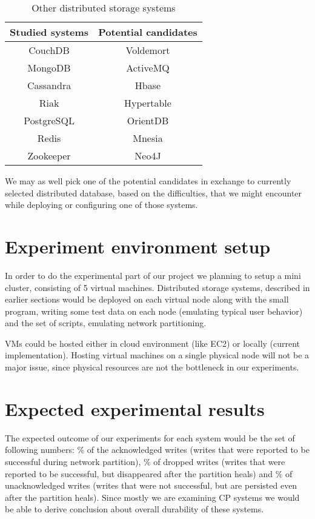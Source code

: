\documentclass[a4paper]{article}
\begin{document}
\begin{table}
	\centering
	\begin{tabular}{|c|c|}
		\hline
		\rowcolor{light-gray} \textbf{Studied systems} & \textbf{Potential candidates} \\ \hline
		CouchDB & Voldemort  \\ \hline
		MongoDB & ActiveMQ  \\ \hline
		Cassandra & Hbase  \\ \hline
		Riak & Hypertable  \\ \hline
		PostgreSQL & OrientDB  \\ \hline
		Redis & Mnesia  \\ \hline
		Zookeeper & Neo4J  \\ \hline
	\end{tabular}
	\caption{Other distributed storage systems}
	\label{tab:cacndidates}
\end{table}

We may as well pick one of the potential candidates in exchange to currently selected distributed database, based on the difficulties, that we might encounter while deploying or configuring one of those systems.

\section{Experiment environment setup}

In order to do the experimental part of our project we planning to setup a mini cluster, consisting of 5 virtual machines.
Distributed storage systems, described in earlier sections would be deployed on each virtual node along with the small program, writing some test data on each node (emulating typical user behavior) and the set of scripts, emulating network partitioning.

VMs could be hosted either in cloud environment (like EC2) or locally (current implementation).
Hosting virtual machines on a single physical node will not be a major issue, since physical resources are not the bottleneck in our experiments.

\section{Expected experimental results}

The expected outcome of our experiments for each system would be the set of following numbers: \% of the acknowledged writes (writes that were reported to be successful during network partition), \% of dropped writes (writes that were reported to be successful, but disappeared after the partition heals) and \% of unacknowledged writes (writes that were not successful, but are persisted even after the partition heals).
Since mostly we are examining CP systems we would be able to derive conclusion about overall durability of these systems.
\end{document}
